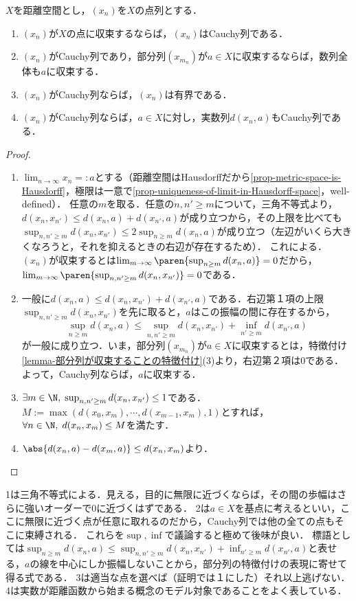 \documentclass[uplatex,dvipdfmx]{jsreport}
\begin{document}
\begin{lemma}\label{lemma-Cauchy-sequence}
    $X$を距離空間とし，$(x_n)$を$X$の点列とする．
    \begin{enumerate}
        \item $(x_n)$が$X$の点に収束するならば，$(x_n)$はCauchy列である．
        \item $(x_n)$がCauchy列であり，部分列$(x_{m_n})$が$a\in X$に収束するならば，数列全体も$a$に収束する．
        \item $(x_n)$がCauchy列ならば，$(x_n)$は有界である．
        \item $(x_n)$がCauchy列ならば，$a\in X$に対し，実数列$d(x_n,a)$もCauchy列である．
    \end{enumerate}
\end{lemma}
\begin{proof}\mbox{}
    \begin{enumerate}
        \item $\lim_{n\to\infty}x_n=:a$とする（距離空間はHausdorffだから\ref{prop-metric-space-is-Hausdorff}，極限は一意で\ref{prop-uniqueness-of-limit-in-Hausdorff-space}，well-defined）．
        任意の$m$を取る．任意の$n,n'\ge m$について，三角不等式より，$d(x_n,x_{n'})\le d(x_n,a)+d(x_{n'},a)$が成り立つから，その上限を比べても$\sup_{n,n'\ge m}d(x_n,x_{n'})\le 2\sup_{n\ge m}d(x_n,a)$が成り立つ（左辺がいくら大きくなろうと，それを抑えるときの右辺が存在するため）．
        これによる．$(x_n)$が収束するとは$\lim_{m\to\infty}\paren{\sup_{n\ge m}d(x_n,a)}=0$だから，$\lim_{m\to\infty}\paren{\sup_{n,n'\ge m}d(x_n,x_{n'})}=0$である．
        \item 
        一般に$d(x_n,a)\le d(x_n,x_{n'})+d(x_{n'},a)$である．右辺第１項の上限$\sup_{n,n'\ge m}d(x_n,x_{n'})$を先に取ると，$a$はこの振幅の間に存在するから，
        \[\sup_{n\ge m}d(x_n,a)\le \sup_{n,n'\ge m}d(x_n,x_{n'})+\inf_{n'\ge m}d(x_{n'},a)\]
        が一般に成り立つ．いま，部分列$(x_{m_n})$が$a\in X$に収束するとは，特徴付け\ref{lemma-部分列が収束することの特徴付け}(3)より，右辺第２項は$0$である．
        よって，Cauchy列ならば，$a$に収束する．
        \item 
        $\exists m\in\N,\;\sup_{n,n'\ge m}d(x_n,x_{n'})\le 1$である．$M:=\max(d(x_0,x_m),\cdots,d(x_{m-1},x_m),1)$とすれば，$\forall n\in\N,\;d(x_n,x_m)\le M$を満たす．
        \item
        $\abs{d(x_n,a)-d(x_m,a)}\le d(x_n,x_m)$より．
    \end{enumerate}
\end{proof}
\begin{remarks}
    1は三角不等式による．見える，目的に無限に近づくならば，その間の歩幅はさらに強いオーダーで0に近づくはずである．
    2は$a\in X$を基点に考えるといい，ここに無限に近づく点が任意に取れるのだから，Cauchy列では他の全ての点もそこに束縛される．
    これらを$\sup,\inf$で議論すると極めて後味が良い．
    標語としては$\sup_{n\ge m}d(x_n,a)\le \sup_{n,n'\ge m}d(x_n,x_{n'})+\inf_{n'\ge m}d(x_{n'},a)$と表せる，$a$の線を中心にしか振幅しないことから，部分列の特徴付けの表現に寄せて得る式である．
    3は適当な点を選べば（証明では１にした）それ以上逃げない．
    4は実数が距離函数から始まる概念のモデル対象であることをよく表している．
\end{remarks}
\end{document}
